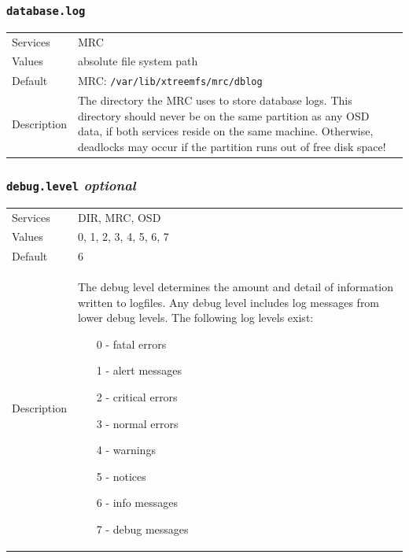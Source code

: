 \documentclass[a4paper,10pt]{book}
\begin{document}
\subsubsection{\texttt{database.log}}
\begin{tabular}{lp{10cm}}
 Services & MRC\\
 Values   & absolute file system path\\
 Default  & MRC: \texttt{/var/lib/xtreemfs/mrc/dblog}\\
 Description & The directory the MRC uses to store database logs. This directory should never be on the same partition as any OSD data, if both services reside on the same machine. Otherwise, deadlocks may occur if the partition runs out of free disk space!
\end{tabular}

\subsubsection{\texttt{debug.level} \textit{optional}}
\begin{tabular}{lp{10cm}}
 Services & DIR, MRC, OSD\\
 Values   & 0, 1, 2, 3, 4, 5, 6, 7 \\
 Default  & 6 \\
 Description & The debug level determines the amount and detail of information written to logfiles. Any debug level includes log messages from lower debug levels. The following log levels exist:
\begin{enumerate}
 \item[0 -] fatal errors
 \item[1 -] alert messages
 \item[2 -] critical errors
 \item[3 -] normal errors
 \item[4 -] warnings
 \item[5 -] notices
 \item[6 -] info messages
 \item[7 -] debug messages
\end{enumerate}
\end{tabular}
\end{document}
